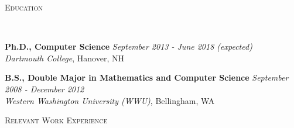 \documentclass[9pt]{article}
\newenvironment{changemargin}[2]{%
  \begin{list}{}{%
    \setlength{\topsep}{0pt}%
    \setlength{\leftmargin}{#1}%
    \setlength{\rightmargin}{#2}%
    \setlength{\listparindent}{\parindent}%
    \setlength{\itemindent}{\parindent}%
    \setlength{\parsep}{\parskip}%
  }%
  \item[]}{\end{list}
}
\newcommand{\lineover}{
	\begin{changemargin}{-0.05in}{-0.05in}
		\vspace*{-8pt}
		\hrulefill \\
		\vspace*{-2pt}
	\end{changemargin}
}
\newcommand{\header}[1]{
	\begin{changemargin}{-0.5in}{-0.5in}
		\scshape{#1}\\
  		\lineover
	\end{changemargin}
}
\newenvironment{body} {
	\vspace*{-16pt}
	\begin{changemargin}{-0.20in}{-0.5in}
  }	
	{\end{changemargin}
}
\begin{document}
\header{Education}

\begin{body}
	\vspace{14pt}
	
	\textbf{Ph.D., Computer Science}{} \hfill \emph{September 2013 - June 2018 (expected)}{} \\
	\emph{Dartmouth College}, Hanover, NH{} \\
	\medskip

	\textbf{B.S., Double Major in Mathematics and Computer Science}{} \hfill \emph{September 2008 - December 2012}{} \\
	\emph{Western Washington University (WWU)}, Bellingham, WA{} \\
	
	
	
\end{body}

\smallskip


\header{Relevant Work Experience}
\end{document}

